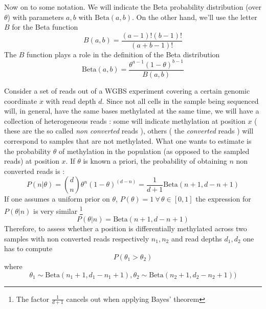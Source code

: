 \documentclass[11pt]{amsart}
\begin{document}
Now on to some notation. We will indicate the Beta probability distribution (over $\theta$) with parameters $a,b$ with $\mbox{Beta}(a,b)$. On the other hand, we'll use the letter $B$ for the Beta function 
\[B(a,b)=\frac{(a-1)!(b-1)!}{(a+b-1)!}\] The $B$ function plays a role in the definition of the Beta distribution \[\mbox{Beta}(a,b)=\frac{\theta^{a-1}(1-\theta)^{b-1}}{B(a,b)}\]
 
Consider a set of reads out of a WGBS experiment covering a certain genomic coordinate $x$ with read depth $d$. Since not all cells in the sample being sequenced will, in general,  have the same bases methylated at the same time, we will have a collection of heterogeneous reads : some will indicate methylation at position $x$ ( these are the so called {\em non converted} reads ), others ( the {\em converted} reads ) will correspond to samples that are not methylated. What one wants to estimate is the probability $\theta$ of methylation in the population (as opposed to the sampled reads) at position $x$.  If $\theta$ is known a priori, the probability of obtaining $n$ non converted reads is :
\[P(n|\theta)={d \choose n}\theta^n ({1-\theta})^{(d-n)}=\frac{1}{d+1}\mbox{Beta}(n+1,d-n+1)\]
If one assumes a uniform prior on $\theta$, $P(\theta)=1 \ \forall\, \theta \in [0,1]$ the expression for $P(\theta|n)$ is very similar \footnote{The factor $\frac{1}{d+1}$ cancels out when applying Bayes' theorem}
\[P(\theta|n)=\mbox{Beta}(n+1,d-n+1)\]
Therefore, to assess whether a position is differentially methylated across two samples with non converted reads respectively $n_1,n_2$ and read depths $d_1,d_2$ one
has to compute 
\[P(\theta_1>\theta_2) \] where 
\[ \theta_1 \sim \mbox{Beta}(n_1+1,d_1-n_1+1) , \theta_2 \sim \mbox{Beta}(n_2+1,d_2-n_2+1))\]\label{ineq}

 
\end{document}
